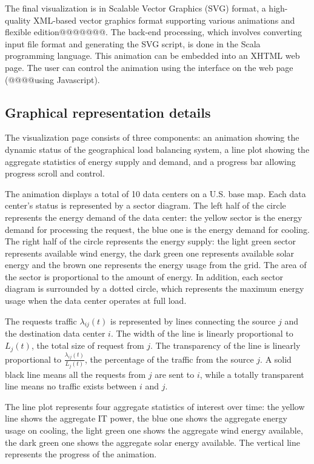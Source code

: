 \documentclass{acm_proc_article-sp}
\begin{document}
The final visualization is in Scalable Vector Graphics (SVG) format, a high-quality XML-based vector graphics format supporting various animations and flexible edition@@@@@@@. The back-end processing, which involves converting input file format and generating the SVG script, is done in the Scala programming language. This animation can be embedded into an XHTML web page. The user can control the animation using the interface on the web page (@@@@using Javascript).

\subsection{Graphical representation details}
The visualization page consists of three components: an animation showing the dynamic status of the geographical load balancing system, a line plot showing the aggregate statistics of energy supply and demand, and a progress bar allowing progress scroll and control.

The animation displays a total of 10 data centers on a U.S. base map. Each data center's status is represented by a sector diagram. The left half of the circle represents the energy demand of the data center: the yellow sector is the energy demand for processing the request, the blue one is the energy demand for cooling. The right half of the circle represents the energy supply: the light green sector represents available wind energy, the dark green one represents available solar energy and the brown one represents the energy usage from the grid. The area of the sector is proportional to the amount of energy. In addition, each sector diagram is surrounded by a dotted circle, which represents the maximum energy usage when the data center operates at full load.

The requests traffic $\lambda_{ij}(t)$ is represented by lines connecting the source $j$ and the destination data center $i$. The width of the line is linearly proportional to $L_j(t)$, the total size of request from $j$. The transparency of the line is linearly proportional to $\frac{\lambda_{ij}(t)}{L_j(t)}$, the percentage of the traffic from the source $j$. A solid black line means all the requests from $j$ are sent to $i$, while a totally transparent line means no traffic exists between $i$ and $j$.

The line plot represents four aggregate statistics of interest over time: the yellow line shows the aggregate IT power, the blue one shows the aggregate energy usage on cooling, the light green one shows the aggregate wind energy available, the dark green one shows the aggregate solar energy available. The vertical line represents the progress of the animation.
\end{document}
